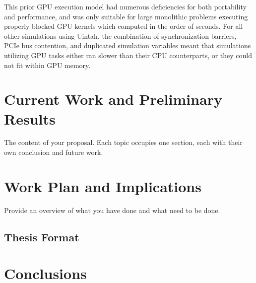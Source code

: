 \documentclass[12pt]{article}
\begin{document}
This prior GPU execution model had numerous deficiencies for both portability and performance, and was only suitable for large monolithic problems executing properly blocked GPU kernels which computed in the order of seconds.  For all other simulations using Uintah, the combination of synchronization barriers, PCIe bus contention, and duplicated simulation variables meant that simulations utilizing GPU tasks either ran slower than their CPU counterparts, or they could not fit within GPU memory.  

\section{Current Work and Preliminary Results}
\label{ch:proposal}

The content of your proposal. Each topic occupies one section, each
with their own conclusion and future work.

\section{Work Plan and Implications}
\label{ch:plan}

Provide an overview of what you have done and what need to be done.

\subsection{Thesis Format}
\label{ch:format}

\section{Conclusions}
\label{ch:plan}





\pagebreak

\begin{footnotesize}


\end{footnotesize}
\end{document}
